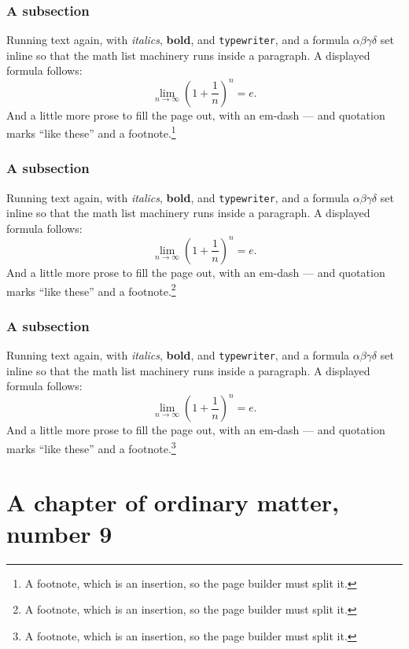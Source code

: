 \documentclass[11pt,a4paper]{report}
\theoremstyle{plain}
\begin{document}
\subsection{A subsection}
Running text again, with \textit{italics}, \textbf{bold}, and
\texttt{typewriter}, and a formula $\alpha\beta\gamma\delta$ set inline so
that the math list machinery runs inside a paragraph. A displayed formula
follows:
\[ \lim_{n\to\infty}\left(1+\frac{1}{n}\right)^{n}=e . \]
And a little more prose to fill the page out, with an em-dash --- and
quotation marks ``like these'' and a footnote.\footnote{A footnote, which is
an insertion, so the page builder must split it.}
\subsection{A subsection}
Running text again, with \textit{italics}, \textbf{bold}, and
\texttt{typewriter}, and a formula $\alpha\beta\gamma\delta$ set inline so
that the math list machinery runs inside a paragraph. A displayed formula
follows:
\[ \lim_{n\to\infty}\left(1+\frac{1}{n}\right)^{n}=e . \]
And a little more prose to fill the page out, with an em-dash --- and
quotation marks ``like these'' and a footnote.\footnote{A footnote, which is
an insertion, so the page builder must split it.}
\subsection{A subsection}
Running text again, with \textit{italics}, \textbf{bold}, and
\texttt{typewriter}, and a formula $\alpha\beta\gamma\delta$ set inline so
that the math list machinery runs inside a paragraph. A displayed formula
follows:
\[ \lim_{n\to\infty}\left(1+\frac{1}{n}\right)^{n}=e . \]
And a little more prose to fill the page out, with an em-dash --- and
quotation marks ``like these'' and a footnote.\footnote{A footnote, which is
an insertion, so the page builder must split it.}
\chapter{A chapter of ordinary matter, number 9}
\end{document}
